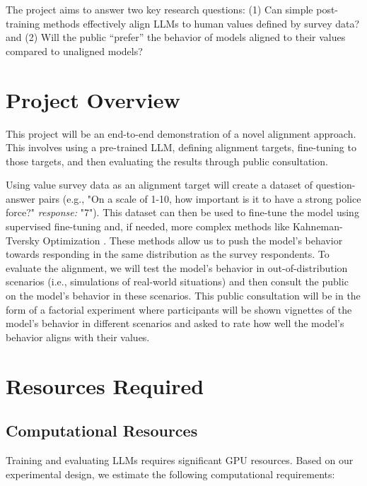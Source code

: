 \documentclass[11pt, a4paper]{article}
\newcommand{\scare}[1]{\enquote{#1}}
\begin{document}
The project aims to answer two key research questions: (1) Can simple post-training methods effectively align LLMs to human values defined by survey data? and (2) Will the public \scare{prefer} the behavior of models aligned to their values compared to unaligned models?

\section{Project Overview}

This project will be an end-to-end demonstration of a novel alignment approach. This involves using a pre-trained LLM, defining alignment targets, fine-tuning to those targets, and then evaluating the results through public consultation.

Using value survey data as an alignment target will create a dataset of question-answer pairs (e.g., "On a scale of 1-10, how important is it to have a strong police force?" \textit{response:} "7"). This dataset can then be used to fine-tune the model using supervised fine-tuning \cite{ouyangTrainingLanguageModels2022} and, if needed, more complex methods like Kahneman-Tversky Optimization \cite{ethayarajhKTOModelAlignment2024}. These methods allow us to push the model's behavior towards responding in the same distribution as the survey respondents. To evaluate the alignment, we will test the model's behavior in out-of-distribution scenarios (i.e., simulations of real-world situations) and then consult the public on the model's behavior in these scenarios. This public consultation will be in the form of a factorial experiment \cite{internetarchiveMeasuringSocialJudgments1982} where participants will be shown vignettes of the model's behavior in different scenarios and asked to rate how well the model's behavior aligns with their values.

\section{Resources Required}

\subsection{Computational Resources}

Training and evaluating LLMs requires significant GPU resources. Based on our experimental design, we estimate the following computational requirements:
\end{document}
